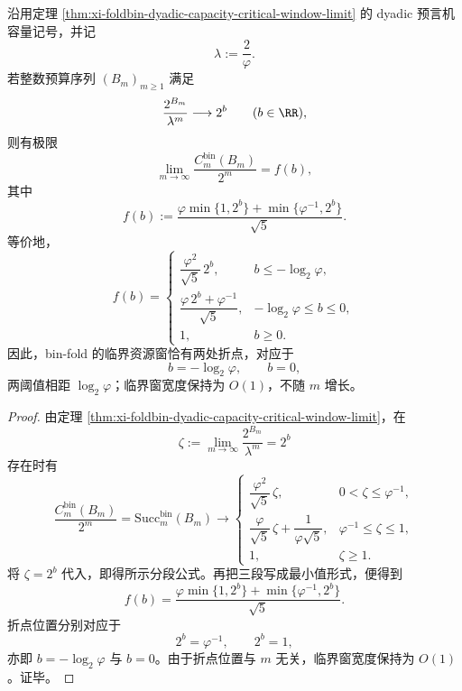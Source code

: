 \begin{corollary}\label{cor:xi-time-part9t-binfold-critical-window-two-break-scaling}
沿用定理 \ref{thm:xi-foldbin-dyadic-capacity-critical-window-limit} 的 dyadic 预言机容量记号，并记
\[
\lambda:=\frac{2}{\varphi}.
\]
若整数预算序列 \((B_m)_{m\ge 1}\) 满足
\[
\frac{2^{B_m}}{\lambda^m}\longrightarrow 2^b
\qquad (b\in\RR),
\]
则有极限
\[
\lim_{m\to\infty}\frac{C_m^{\mathrm{bin}}(B_m)}{2^m}
=
f(b),
\]
其中
\[
f(b)
:=
\frac{\varphi\min\{1,2^b\}+\min\{\varphi^{-1},2^b\}}{\sqrt5}.
\]
等价地，
\[
f(b)=
\begin{cases}
\dfrac{\varphi^2}{\sqrt5}\,2^b,
& b\le -\log_2\varphi,\\[8pt]
\dfrac{\varphi\,2^b+\varphi^{-1}}{\sqrt5},
& -\log_2\varphi\le b\le 0,\\[10pt]
1,
& b\ge 0.
\end{cases}
\]
因此，bin-fold 的临界资源窗恰有两处折点，对应于
\[
b=-\log_2\varphi,
\qquad
b=0,
\]
两阈值相距 \(\log_2\varphi\)；临界窗宽度保持为 \(O(1)\)，不随 \(m\) 增长。
\end{corollary}
\begin{proof}
由定理 \ref{thm:xi-foldbin-dyadic-capacity-critical-window-limit}，在
\[
\zeta:=\lim_{m\to\infty}\frac{2^{B_m}}{\lambda^m}=2^b
\]
存在时有
\[
\frac{C_m^{\mathrm{bin}}(B_m)}{2^m}
=
\mathrm{Succ}_m^{\mathrm{bin}}(B_m)
\longrightarrow
\begin{cases}
\dfrac{\varphi^2}{\sqrt5}\,\zeta,
& 0<\zeta\le \varphi^{-1},\\[8pt]
\dfrac{\varphi}{\sqrt5}\,\zeta+\dfrac{1}{\varphi\sqrt5},
& \varphi^{-1}\le \zeta\le 1,\\[10pt]
1,
& \zeta\ge 1.
\end{cases}
\]
将 \(\zeta=2^b\) 代入，即得所示分段公式。再把三段写成最小值形式，便得到
\[
f(b)=\frac{\varphi\min\{1,2^b\}+\min\{\varphi^{-1},2^b\}}{\sqrt5}.
\]
折点位置分别对应于
\[
2^b=\varphi^{-1},
\qquad
2^b=1,
\]
亦即 \(b=-\log_2\varphi\) 与 \(b=0\)。由于折点位置与 \(m\) 无关，临界窗宽度保持为 \(O(1)\)。证毕。
\end{proof}

\endinput
